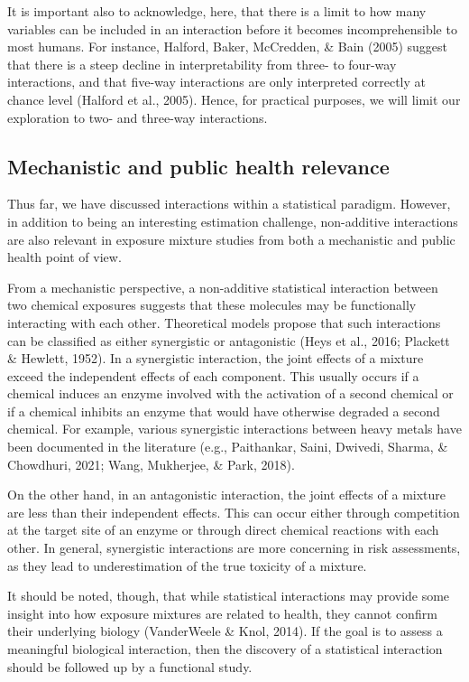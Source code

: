 \documentclass[12pt, twoside]{amherstthesis}
\begin{document}
It is important also to acknowledge, here, that there is a limit to how many variables can be included in an interaction before it becomes incomprehensible to most humans. For instance, Halford, Baker, McCredden, \& Bain (2005) suggest that there is a steep decline in interpretability from three- to four-way interactions, and that five-way interactions are only interpreted correctly at chance level (Halford et al., 2005). Hence, for practical purposes, we will limit our exploration to two- and three-way interactions.

\hypertarget{mechanistic-and-public-health-relevance}{%
\subsection{Mechanistic and public health relevance}\label{mechanistic-and-public-health-relevance}}

Thus far, we have discussed interactions within a statistical paradigm. However, in addition to being an interesting estimation challenge, non-additive interactions are also relevant in exposure mixture studies from both a mechanistic and public health point of view.

From a mechanistic perspective, a non-additive statistical interaction between two chemical exposures suggests that these molecules may be functionally interacting with each other. Theoretical models propose that such interactions can be classified as either synergistic or antagonistic (Heys et al., 2016; Plackett \& Hewlett, 1952). In a synergistic interaction, the joint effects of a mixture exceed the independent effects of each component. This usually occurs if a chemical induces an enzyme involved with the activation of a second chemical or if a chemical inhibits an enzyme that would have otherwise degraded a second chemical. For example, various synergistic interactions between heavy metals have been documented in the literature (e.g., Paithankar, Saini, Dwivedi, Sharma, \& Chowdhuri, 2021; Wang, Mukherjee, \& Park, 2018).

On the other hand, in an antagonistic interaction, the joint effects of a mixture are less than their independent effects. This can occur either through competition at the target site of an enzyme or through direct chemical reactions with each other. In general, synergistic interactions are more concerning in risk assessments, as they lead to underestimation of the true toxicity of a mixture.

It should be noted, though, that while statistical interactions may provide some insight into how exposure mixtures are related to health, they cannot confirm their underlying biology (VanderWeele \& Knol, 2014). If the goal is to assess a meaningful biological interaction, then the discovery of a statistical interaction should be followed up by a functional study.
\end{document}
